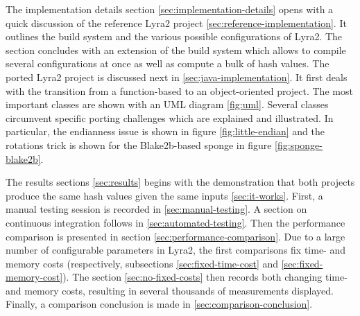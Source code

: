 The implementation details section \ref{sec:implementation-details} opens with a quick discussion of the reference Lyra2 project \ref{sec:reference-implementation}. It outlines the build system and the various possible configurations of Lyra2. The section concludes with an extension of the build system which allows to compile several configurations at once as well as compute a bulk of hash values. The ported Lyra2 project is discussed next in \ref{sec:java-implementation}. It first deals with the transition from a function-based to an object-oriented project. The most important classes are shown with an UML diagram \ref{fig:uml}. Several classes circumvent specific porting challenges which are explained and illustrated. In particular, the endianness issue is shown in figure \ref{fig:little-endian} and the rotations trick is shown for the Blake2b-based sponge in figure \ref{fig:sponge-blake2b}.

The results sections \ref{sec:results} begins with the demonstration that both projects produce the same hash values given the same inputs \ref{sec:it-works}. First, a manual testing session is recorded in \ref{sec:manual-testing}. A section on continuous integration follows in \ref{sec:automated-testing}. Then the performance comparison is presented in section \ref{sec:performance-comparison}. Due to a large number of configurable parameters in Lyra2, the first comparisons fix time- and memory costs (respectively, subsections \ref{sec:fixed-time-cost} and \ref{sec:fixed-memory-cost}). The section \ref{sec:no-fixed-costs} then records both changing time- and memory costs, resulting in several thousands of measurements displayed. Finally, a comparison conclusion is made in \ref{sec:comparison-conclusion}.
